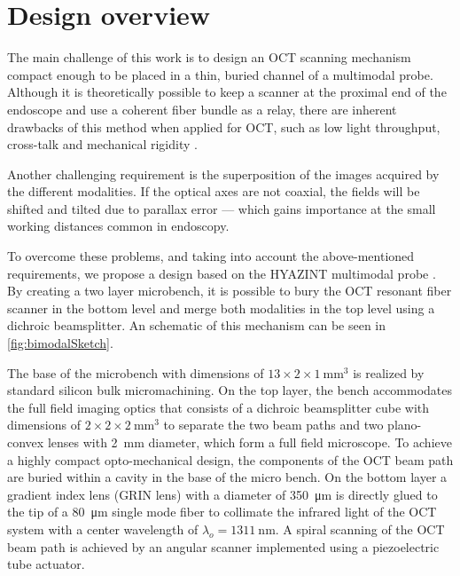  

\section{Design overview}
\label{sec:designov}

The main challenge of this work is to design an OCT scanning mechanism compact enough to be placed in a thin, buried channel of a multimodal probe.  Although it is theoretically possible to keep a scanner at the proximal end of the endoscope and use a coherent fiber bundle as a relay, there are inherent drawbacks of this method when applied for OCT, such as low light throughput, cross-talk and mechanical rigidity \cite{Ford2009}. 

Another challenging requirement is the superposition of the images acquired by the different modalities. If the optical axes are not coaxial, the fields will be shifted and tilted due to parallax error --- which gains importance at the small working distances common in endoscopy.

To overcome these problems, and taking into account the above-mentioned requirements, we propose a design based on the HYAZINT multimodal probe \cite{Blattmann}. By creating a two layer microbench, it is possible to bury the OCT resonant fiber scanner in the bottom level and merge both modalities in the top level using a dichroic beamsplitter. An schematic of this mechanism can be seen in \autoref{fig:bimodalSketch}.

The base of the microbench with dimensions of $13 \times 2 \times \SI{1}{\milli\meter^3} $ is realized by standard silicon bulk micromachining. On the top layer, the bench accommodates the full field imaging optics that consists of a dichroic beamsplitter cube with dimensions of $2\times 2 \times  \SI{2}{\milli\meter^3}$ to separate the two beam paths and two plano-convex lenses with \SI{2}{\milli\meter} diameter, which form a full field microscope. To achieve a highly compact opto-mechanical design, the components of the OCT beam path are buried within a cavity in the base of the micro bench. On the bottom layer a gradient index lens (GRIN lens) with a diameter of \SI{350}{\micro\meter} is directly glued to the tip of a \SI{80}{\micro\meter} single mode fiber to collimate the infrared light of the OCT system with a center wavelength of $\lambda_o = \SI{1311}{\nano\meter}$. A spiral scanning of the OCT beam path is achieved by an angular scanner implemented using a piezoelectric tube actuator.

